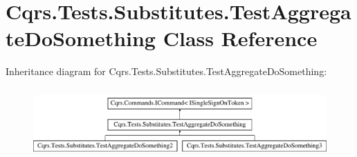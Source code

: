 \hypertarget{classCqrs_1_1Tests_1_1Substitutes_1_1TestAggregateDoSomething}{}\section{Cqrs.\+Tests.\+Substitutes.\+Test\+Aggregate\+Do\+Something Class Reference}
\label{classCqrs_1_1Tests_1_1Substitutes_1_1TestAggregateDoSomething}
Inheritance diagram for Cqrs.\+Tests.\+Substitutes.\+Test\+Aggregate\+Do\+Something\+:\begin{figure}[H]
\begin{center}
\leavevmode
\includegraphics[height=2.700965cm]{classCqrs_1_1Tests_1_1Substitutes_1_1TestAggregateDoSomething}
\end{center}
\end{figure}
